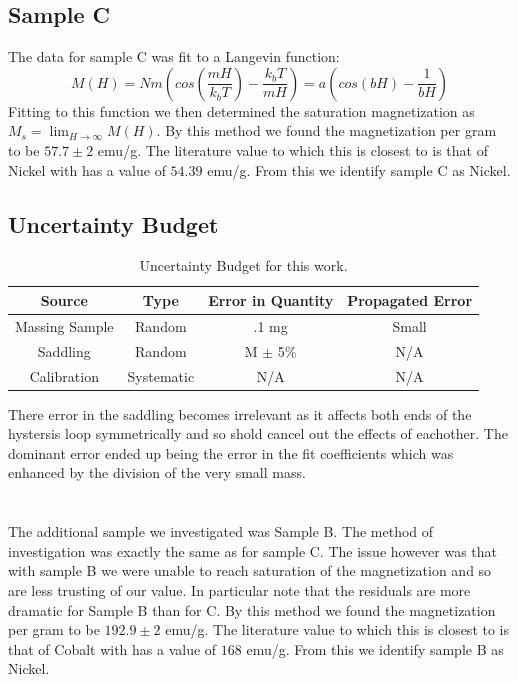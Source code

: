 \documentclass[11pt,letterpaper]{article}
\begin{document}
\subsection{Sample C}
The data for sample C was fit to a Langevin function:
\begin{equation}
M(H)=N m\left(cos(\frac{m H}{k_b T})-\frac{k_b T}{m H}\right) = a\left(cos(b H)-\frac{1}{b H}\right)
\end{equation}
Fitting to this function we then determined the saturation magnetization as $M_s=\lim_{H\to\infty} M(H)$. By this method we found the magnetization per gram to be $57.7\pm 2$ emu/g. The literature value to which this is closest to is that of Nickel with has a value of $54.39$ emu/g. From this we identify sample C as Nickel.
\subsection{Uncertainty Budget}
\begin{table}[!h]
	\begin{center} 
		\begin{tabular}{|c|c|c|c|} \hline 
			Source & Type&  Error in Quantity  & Propagated Error  \\ \hline \hline
			Massing Sample & Random & .1 mg & Small \\ \hline
			Saddling & Random & M $\pm$ 5\%& N/A\\ \hline
			Calibration &  Systematic& N/A & N/A \\ \hline
            
			\hline
		\end{tabular}
        \caption{Uncertainty Budget for this work.}
	\end{center}
\end{table}
There error in the saddling becomes irrelevant as it affects both ends of the hystersis loop symmetrically and so shold cancel out the effects of eachother.
The dominant error ended up being the error in the fit coefficients which was enhanced by the division of the very small mass.
\section{} %
The additional sample we investigated was Sample B. The method of investigation was exactly the same as for sample C. The issue however was that with sample B we were unable to reach saturation of the magnetization and so are less trusting of our value. In particular note that the residuals are more dramatic for Sample B than for C. 
By this method we found the magnetization per gram to be $192.9\pm 2$ emu/g. The literature value to which this is closest to is that of Cobalt with has a value of $168$ emu/g. From this we identify sample B as Nickel.
\end{document}
